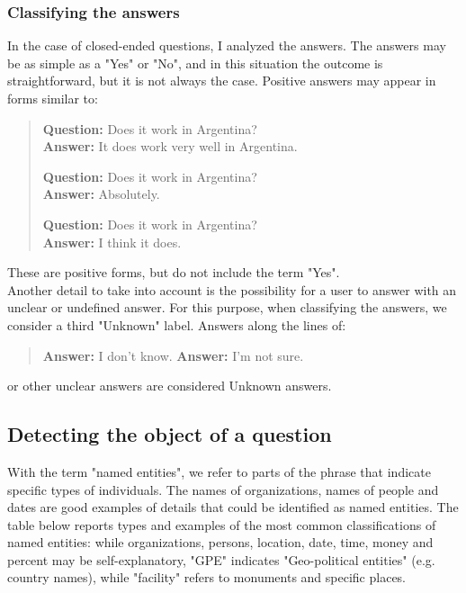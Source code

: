 \documentclass[LaM,oneside,binding=0.6cm]{sapthesis}
\begin{document}
\subsubsection{Classifying the answers}
In the case of closed-ended questions, I analyzed the answers.
The answers may be as simple as a "Yes" or "No", and in this situation the outcome is straightforward, but it is not always the case.
Positive answers may appear in forms similar to:
\begin{quote}
\textbf{Question:} Does it work in Argentina? \\
\textbf{Answer:} It does work very well in Argentina.

\textbf{Question:} Does it work in Argentina? \\
\textbf{Answer:} Absolutely.

\textbf{Question:} Does it work in Argentina? \\
\textbf{Answer:} I think it does.
\end{quote}
These are positive forms, but do not include the term "Yes". \\

Another detail to take into account is the possibility for a user to answer with an unclear or undefined answer. For this purpose, when classifying the answers, we consider a third "Unknown" label.
Answers along the lines of:

\begin{quote}
\textbf{Answer:} I don't know.
\textbf{Answer:} I'm not sure.
\end{quote}

or other unclear answers are considered Unknown answers.

\subsection{Detecting the object of a question}

With the term "named entities", we refer to parts of the phrase that indicate specific types of individuals. The names of organizations, names of people and dates are good examples of details that could be identified as named entities. The table below reports types and examples of the most common classifications of named entities: while organizations, persons, location, date, time, money and percent may be self-explanatory, "GPE" indicates "Geo-political entities" (e.g. country names), while "facility" refers to monuments and specific places.
\end{document}
